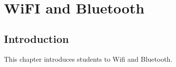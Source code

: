 \chapter{WiFI and Bluetooth}

\section{Introduction}
This chapter introduces students to Wifi and Bluetooth.
